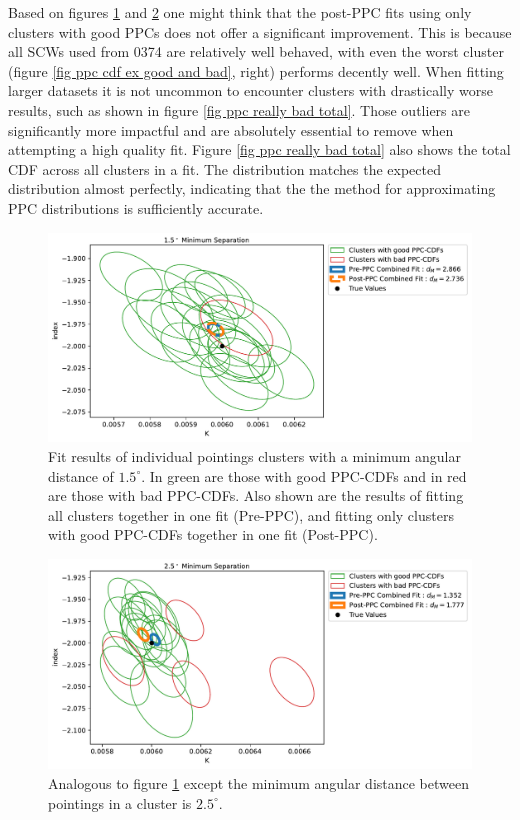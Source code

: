 \documentclass{report}
\begin{document}
Based on figures \ref{ppc indv fits 1.5} and \ref{ppc indv fits 2.5} one might think that the post-PPC fits using only clusters with good PPCs does not offer a significant improvement. This is because all SCWs used from 0374 are relatively well behaved, with even the worst cluster (figure \ref{fig ppc cdf ex good and bad}, right) performs decently well. When fitting larger datasets it is not uncommon to encounter clusters with drastically worse results, such as shown in figure \ref{fig ppc really bad total}. Those outliers are significantly more impactful and are absolutely essential to remove when attempting a high quality fit. Figure \ref{fig ppc really bad total} also shows the total CDF across all clusters in a fit. The distribution matches the expected distribution almost perfectly, indicating that the the method for approximating PPC distributions is sufficiently accurate. 

\pagebreak
\begin{figure}[H]
  \centering
  \includegraphics[width=\textwidth]{Images/PPC_and_Background_Analysis/combined_plot_0374_ppc_normal.pdf}
  \caption{Fit results of individual pointings clusters with a minimum angular distance of $1.5^\circ$. In green are those with good PPC-CDFs and in red are those with bad PPC-CDFs. Also shown are the results of fitting all clusters together in one fit (Pre-PPC), and fitting only clusters with good PPC-CDFs together in one fit (Post-PPC).}
  \label{ppc indv fits 1.5}
\end{figure}

\begin{figure}[H]
  \centering
  \includegraphics[width=\textwidth]{Images/PPC_and_Background_Analysis/combined_plot_0374_ppc_far.pdf}
  \caption{Analogous to figure \ref{ppc indv fits 1.5} except the minimum angular distance between pointings in a cluster is $2.5^\circ$.}
  \label{ppc indv fits 2.5}
\end{figure}
\end{document}
